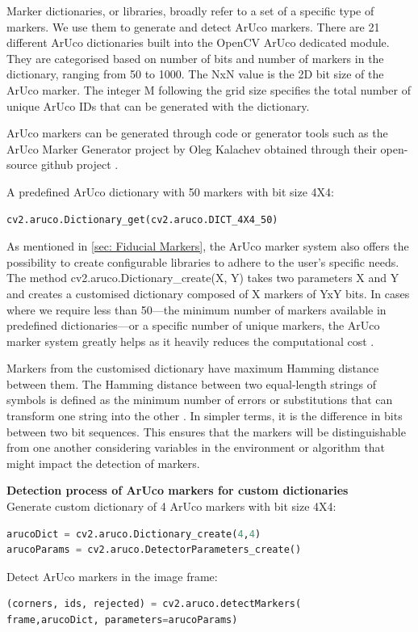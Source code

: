 \documentclass[12pt,a4paper]{report}
\def\aruco{ArUco }
\begin{document}
Marker dictionaries, or libraries, broadly refer to a set of a specific type of markers. We use them to generate and detect \aruco markers. There are 21 different ArUco dictionaries built into the OpenCV \aruco dedicated module. They are categorised based on number of bits and number of markers in the dictionary, ranging from 50 to 1000. The NxN value is the 2D bit size of the \aruco marker. The integer M following the grid size specifies the total number of unique \aruco IDs that can be generated with the dictionary.

\aruco markers can be generated through code or generator tools such as the ArUco Marker Generator project by Oleg Kalachev obtained through their open-source github project \cite{arucogenerator}.

\newpage
A predefined \aruco dictionary with 50 markers with bit size 4X4:
\begin{lstlisting}[language=Python, frame=single]
cv2.aruco.Dictionary_get(cv2.aruco.DICT_4X4_50)
\end{lstlisting}

As mentioned in \autoref{sec: Fiducial Markers}, the \aruco marker system also offers the possibility to create configurable libraries to adhere to the user's specific needs. The method cv2.aruco.Dictionary\_create(X, Y) takes two parameters X and Y and creates a customised dictionary composed of X markers of YxY bits. In cases where we require less than 50---the minimum number of markers available in predefined dictionaries---or a specific number of unique markers, the \aruco marker system greatly helps as it heavily reduces the computational cost \cite{FMforposeestimation}.

Markers from the customised dictionary have maximum Hamming distance between them. The Hamming distance between two equal-length strings of symbols is defined as the minimum number of errors or substitutions that can transform one string into the other \cite{hammingdistancedefn}. In simpler terms, it is the difference in bits between two bit sequences. This ensures that the markers will be distinguishable from one another considering variables in the environment or algorithm that might impact the detection of markers.

\textbf{Detection process of \aruco markers for custom dictionaries\\}
Generate custom dictionary of 4 \aruco markers with bit size 4X4:
\begin{lstlisting}[language=Python, frame=single]
arucoDict = cv2.aruco.Dictionary_create(4,4)
arucoParams = cv2.aruco.DetectorParameters_create()
\end{lstlisting}
Detect ArUco markers in the image frame:
\begin{lstlisting}[language=Python,frame=single]
(corners, ids, rejected) = cv2.aruco.detectMarkers(
frame,arucoDict, parameters=arucoParams)
\end{lstlisting}
\end{document}
